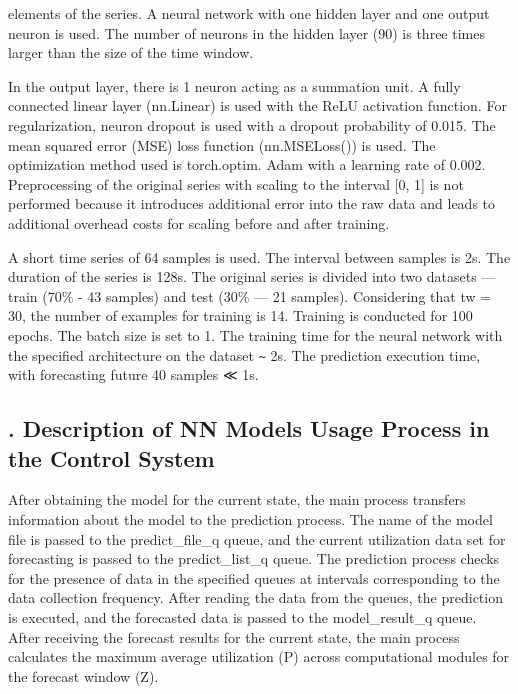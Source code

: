 \documentclass[a4paper,8pt]{article}
\date{}
\begin{document}
\begin{multicols}{2}
elements of the series. A neural network with one hidden layer and one output neuron is used. The number of neurons in the hidden layer (90) is three times larger than the size of the time window.

In the output layer, there is 1 neuron acting as a summation unit. A fully connected linear layer (nn.Linear) is used with the ReLU activation function. For regularization, neuron dropout is used with a dropout probability of 0.015. The mean squared error (MSE) loss function (nn.MSELoss()) is used. The optimization method used is torch.optim. Adam with a learning rate of 0.002. Preprocessing of the original series with scaling to the interval [0, 1] is not performed because it introduces additional error into the raw data and leads to additional overhead costs for scaling before and after training.

A short time series of 64 samples is used. The interval between samples is 2s. The duration of the series is 128s. The original series is divided into two datasets — train (70\% - 43 samples) and test (30\% — 21 samples). Considering that tw = 30, the number of examples for training is 14. Training is conducted for 100 epochs. The batch size is set to 1. The training time for the neural network with the specified architecture on the dataset \texttt{\~{}} 2s. The prediction execution time, with forecasting future 40 samples ≪ 1s.

\subsection*{\centering \MakeUppercase{}. Description of NN Models Usage Process in the Control System}

After obtaining the model for the current state, the main process transfers information about the model to the prediction process. The name of the model file is passed to the predict\_file\_q queue, and the current utilization data set for forecasting is passed to the predict\_list\_q queue. The prediction process checks for the presence of data in the specified queues at intervals corresponding to the data collection frequency. After reading the data from the queues, the prediction is executed, and the forecasted data is passed to the model\_result\_q queue. After receiving the forecast results for the current state, the main process calculates the maximum average utilization (P) across computational modules for the forecast window (Z).


\end{multicols}
\end{document}
